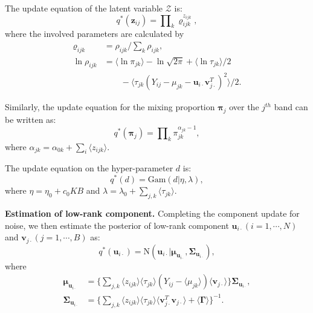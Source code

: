 \documentclass[journal]{IEEEtran}
\begin{document}
The update equation of the latent variable $ \mathcal{Z} $ is:
\begin{equation} \label{z}
q^*(\bm{z}_{ij}) = \prod\nolimits_k{\varrho_{ijk}^{z_{ijk}}},
\end{equation}
where the involved parameters are calculated by
\begin{equation} \label{z1}
\begin{split}
\varrho_{ijk}& = \rho_{ijk}/ \sum\nolimits_k{\rho_{ijk}},\\
\ln\rho_{ijk} & =  \langle \ln \pi_{jk} \rangle - \ln \sqrt{2\pi} + \langle \ln \tau_{jk} \rangle/2 \\
&\qquad- \langle \tau_{jk}(Y_{ij}-\mu_{jk}-\bm{u}_{i\cdot}\bm{v}_{j\cdot}^T)^2 \rangle/2.
\end{split}
\end{equation}


Similarly, the update equation for the mixing proportion $ \bm{\pi}_j $ over the $ j^{th} $ band can be written as:
\begin{equation}\label{pi}
q^*(\bm{\pi}_{j}) = \prod\nolimits_k{\pi_{jk}^{\alpha_{jk}-1}},
\end{equation}
where $\alpha_{jk}=\alpha_{0k}+\sum_i{\langle z_{ijk} \rangle}$.

The update equation on the hyper-parameter  $ d $ is:
\begin{equation}\label{d}
q^*(d) = \mathrm{Gam}(d|\eta,\lambda),
\end{equation}
where $\eta=\eta_0+c_0KB$ and $\lambda=\lambda_0+\sum_{j,k}{\langle \tau_{jk} \rangle}$.


\textbf{Estimation of low-rank component.} Completing the component update for noise, we then estimate the posterior of low-rank component $ \bm{u}_{i \cdot}(i=1,\cdots,N)$ and $ \bm{v}_{j \cdot}(j=1,\cdots,B) $ as:
\begin{equation}\label{u}
q^*(\bm{u}_{i \cdot})=\mathrm{N}(\bm{u}_{i \cdot}|\bm{\mu}_{\bm{u}_{i \cdot}},\bm{\Sigma}_{\bm{u}_{i \cdot}}),
\end{equation}
where
\begin{equation*} \label{u1}
\begin{split}
\bm{\mu}_{\bm{u}_{i \cdot }} &= \{ \sum\nolimits_{j,k}{ \langle z_{ijk} \rangle \langle \tau_{jk} \rangle   (Y_{ij}- \langle \mu_{jk} \rangle)  \langle \bm{v}_{j \cdot } \rangle } \}\bm{\Sigma}_{\bm{u}_{i \cdot}},\\
\bm{\Sigma}_{\bm{u}_{i \cdot}} &=  \{ \sum\nolimits_{j,k}{ \langle z_{ijk} \rangle   \langle \tau_{jk} \rangle   \langle \bm{v}_{j\cdot }^T \bm{v}_{j\cdot } \rangle  +  \langle \bm{\Gamma} \rangle }  \}^{-1}.
\end{split}
\end{equation*}
\end{document}
